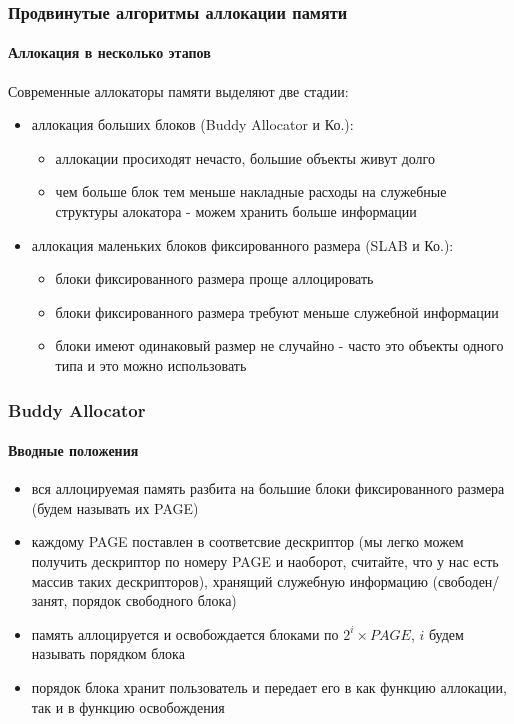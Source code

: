 \begin{frame}
\frametitle{Продвинутые алгоритмы аллокации памяти}
\framesubtitle{Аллокация в несколько этапов}

Современные аллокаторы памяти выделяют две стадии:

\begin{itemize}
  \item<2-> аллокация больших блоков (Buddy Allocator и Ко.):
    \begin{itemize}
      \item аллокации просиходят нечасто, большие объекты живут долго
      \item чем больше блок тем меньше накладные расходы на служебные структуры алокатора - можем хранить больше информации
    \end{itemize}
  \item<3-> аллокация маленьких блоков фиксированного размера (SLAB и Ко.):
    \begin{itemize}
      \item блоки фиксированного размера проще аллоцировать
      \item блоки фиксированного размера требуют меньше служебной информации
      \item блоки имеют одинаковый размер не случайно - часто это объекты одного типа и это можно использовать
    \end{itemize}
\end{itemize}

\end{frame}

\begin{frame}
\frametitle{Buddy Allocator}
\framesubtitle{Вводные положения}

\begin{itemize}
  \item вся аллоцируемая память разбита на большие блоки фиксированного размера (будем называть их PAGE)
  \item каждому PAGE поставлен в соответсвие дескриптор (мы легко можем получить дескриптор по номеру PAGE и наоборот, считайте, что у нас есть массив таких дескрипторов), хранящий служебную информацию (свободен/занят, порядок свободного блока)
  \item память аллоцируется и освобождается блоками по $2^i\times PAGE$, $i$ будем называть порядком блока
  \item порядок блока хранит пользователь и передает его в как функцию аллокации, так и в функцию освобождения
\end{itemize}
\end{frame}

